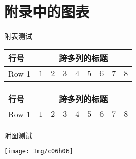 \chapter{附录中的图表}{
\setcounter{app_fig}{1}
\setcounter{app_tab}{1}


附表测试

\begin{apptab}[!htbp]
    \label{apptab:1}
    \centering
    \footnotesize%
    \setlength{\tabcolsep}{4pt}%
    \renewcommand{\arraystretch}{1.2}%
    \begin{tabular}{lcccccccc}
        \hline
        行号 & \multicolumn{8}{c}{跨多列的标题}\\
        \hline
        Row 1 & $1$ & $2$ & $3$ & $4$ & $5$ & $6$ & $7$ & $8$\\
        \hline
    \end{tabular}
\end{apptab}


\begin{apptab}[!htbp]
    \label{apptab:2}
    \centering
    \footnotesize%
    \setlength{\tabcolsep}{4pt}%
    \renewcommand{\arraystretch}{1.2}%
    \begin{tabular}{lcccccccc}
        \hline
        行号 & \multicolumn{8}{c}{跨多列的标题}\\
        \hline
        Row 1 & $1$ & $2$ & $3$ & $4$ & $5$ & $6$ & $7$ & $8$\\
        \hline
    \end{tabular}
\end{apptab}

附图测试

\begin{appfig}[!htbp]
    \centering
    \texttt{[image: Img/c06h06]}
    
    \label{appfig:1}
\end{appfig}

    
}
